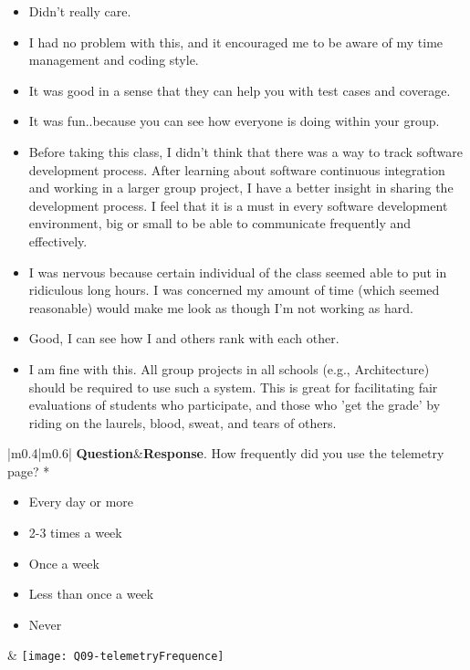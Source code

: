 \begin{itemize}
\item Didn't really care.
\item I had no problem with this, and it encouraged me to be aware of my time management and coding style.
\item It was good in a sense that they can help you with test cases and coverage.
\item It was fun..because you can see how everyone is doing within your group.
\item Before taking this class, I didn't think that there was a way to track software development process. After learning about software continuous integration and working in a larger group project, I have a better insight in sharing the development process. I feel that it is a must in every software development environment, big or small to be able to communicate frequently and effectively. 
\item I was nervous because certain individual of the class seemed able to put in ridiculous long hours.  I was concerned my amount of time (which seemed reasonable) would make me look as though I'm not working as hard. 
\item Good, I can see how I and others rank with each other.
\item I am fine with this.  All group projects in all schools (e.g., Architecture) should be required to use such a system.  This is great for facilitating fair evaluations of students who participate, and those who 'get the grade' by riding on the laurels, blood, sweat, and tears of others.
\end{itemize}

\begin{center}
\footnotesize
\begin{longtable}{|m{}|m{}|}
\hline 
{\bf Question}&{\bf Response}\endhead {}. How frequently did you use the telemetry page? *
\begin{itemize}
\item Every day or more
\item 2-3 times a week
\item Once a week
\item Less than once a week
\item Never
\end{itemize}
&
\label{Q9}
\texttt{[image: Q09-telemetryFrequence]} \\ \hline

\end{longtable}
\end{center}

